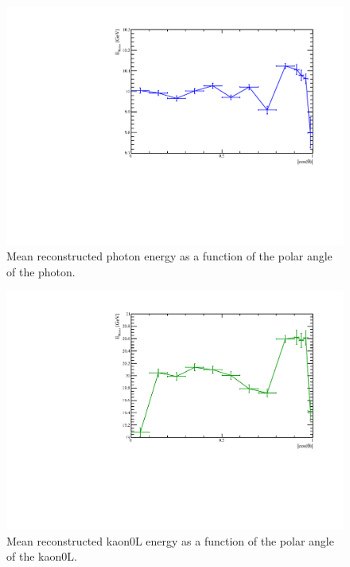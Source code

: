 \begin{figure}
  \includegraphics[width=\largefigwidth]{EnergyEstimators/Plots/Calibration/Validation/AngularDistributionPhotonPlot.pdf}
  \caption[Mean reconstructed photon energy as a function of the polar angle of the photon.]{Mean reconstructed photon energy as a function of the polar angle of the photon.}
  \label{engest:fig:photonangle}
\end{figure}

\begin{figure}
  \includegraphics[width=\largefigwidth]{EnergyEstimators/Plots/Calibration/Validation/AngularDistributionKaon0LPlot.pdf}  \caption[Mean reconstructed kaon0L energy as a function of the polar angle of the kaon0L.]{Mean reconstructed kaon0L energy as a function of the polar angle of the kaon0L.}
    \label{engest:fig:photonangle}
    \end{figure}


